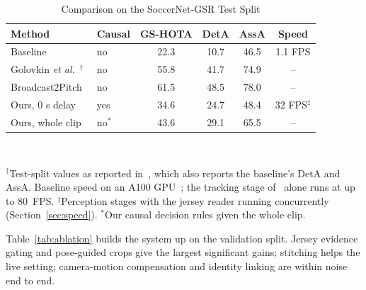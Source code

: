 \documentclass[conference]{IEEEtran}
\begin{document}
\begin{table}[t]
\caption{Comparison on the SoccerNet-GSR Test Split}
\label{tab:compare}
\centering
\footnotesize
\setlength{\tabcolsep}{2.4pt}
\begin{tabular}{@{}llcccc@{}}
\toprule
Method & Causal & GS-HOTA & DetA & AssA & Speed \\
\midrule
Baseline~\cite{somers2024gsr} & no & 22.3 & 10.7 & 46.5 & 1.1 FPS \\
Golovkin \emph{et al.}~\cite{golovkin2025minimap}$^\dagger$ & no & 55.8 & 41.7 & 74.9 & -- \\
Broadcast2Pitch~\cite{oo2026broadcast2pitch} & no & 61.5 & 48.5 & 78.0 & -- \\
\midrule
Ours, 0 s delay & yes & 34.6 & 24.7 & 48.4 & 32 FPS$^\ddagger$ \\
Ours, whole clip & no$^\ast$ & 43.6 & 29.1 & 65.5 & -- \\
\bottomrule
\end{tabular}\\[2pt]
\parbox{\columnwidth}{\scriptsize $^\dagger$Test-split values as reported in~\cite{oo2026broadcast2pitch}, which also reports the baseline's DetA and AssA. Baseline speed on an A100 GPU~\cite{somers2024gsr}; the tracking stage of~\cite{golovkin2025minimap} alone runs at up to 80~FPS. $^\ddagger$Perception stages with the jersey reader running concurrently (Section~\ref{sec:speed}). $^\ast$Our causal decision rules given the whole clip.}
\end{table}

Table~\ref{tab:ablation} builds the system up on the validation split. Jersey evidence gating and pose-guided crops give the largest significant gains; stitching helps the live setting; camera-motion compensation and identity linking are within noise end to end.
\end{document}
